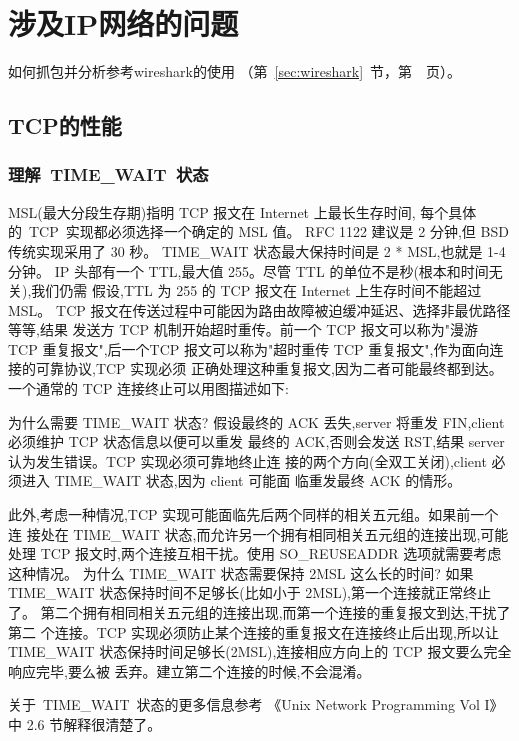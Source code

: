 \chapter{涉及IP网络的问题}

如何抓包并分析参考wireshark的使用
（第~\ref{sec:wireshark}~节，第~\pageref{sec:wireshark}~页）。

\section{TCP的性能}

\subsection{理解~TIME\_WAIT~状态}

MSL(最大分段生存期)指明 TCP 报文在 Internet 上最长生存时间,
每个具体的~TCP~实现都必须选择一个确定的 MSL 值。
RFC 1122 建议是 2 分钟,但 BSD 传统实现采用了 30 秒。
TIME\_WAIT 状态最大保持时间是 2 * MSL,也就是 1-4 分钟。
IP 头部有一个 TTL,最大值 255。尽管 TTL 的单位不是秒(根本和时间无关),我们仍需
假设,TTL 为 255 的 TCP 报文在 Internet 上生存时间不能超过 MSL。
TCP 报文在传送过程中可能因为路由故障被迫缓冲延迟、选择非最优路径等等,结果
发送方 TCP 机制开始超时重传。前一个 TCP 报文可以称为"漫游 TCP 重复报文",后一个TCP 报文可以称为"超时重传 TCP 重复报文",作为面向连接的可靠协议,TCP 实现必须
正确处理这种重复报文,因为二者可能最终都到达。
一个通常的 TCP 连接终止可以用图描述如下:


为什么需要 TIME\_WAIT 状态?
假设最终的 ACK 丢失,server 将重发 FIN,client 必须维护 TCP 状态信息以便可以重发
最终的 ACK,否则会发送 RST,结果 server 认为发生错误。TCP 实现必须可靠地终止连
接的两个方向(全双工关闭),client 必须进入 TIME\_WAIT 状态,因为 client 可能面
临重发最终 ACK 的情形。

此外,考虑一种情况,TCP 实现可能面临先后两个同样的相关五元组。如果前一个连
接处在 TIME\_WAIT 状态,而允许另一个拥有相同相关五元组的连接出现,可能处理
TCP 报文时,两个连接互相干扰。使用 SO\_REUSEADDR 选项就需要考虑这种情况。
为什么 TIME\_WAIT 状态需要保持 2MSL 这么长的时间?
如果 TIME\_WAIT 状态保持时间不足够长(比如小于 2MSL),第一个连接就正常终止了。
第二个拥有相同相关五元组的连接出现,而第一个连接的重复报文到达,干扰了第二
个连接。TCP 实现必须防止某个连接的重复报文在连接终止后出现,所以让 TIME\_WAIT
状态保持时间足够长(2MSL),连接相应方向上的 TCP 报文要么完全响应完毕,要么被
丢弃。建立第二个连接的时候,不会混淆。

关于~TIME\_WAIT~状态的更多信息参考
《Unix Network Programming Vol I》%
中 2.6 节解释很清楚了。


